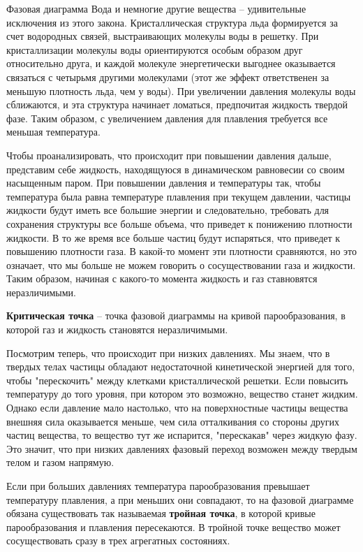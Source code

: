 \documentclass{article}
\newcommand{\definition}[2]{\begin{samepage} \textbf{#1} -- #2. \end{samepage} \par}
\begin{document}
\begin{section}{Фазовая диаграмма}
		Вода и немногие другие вещества -- удивительные исключения из этого закона. Кристаллическая структура льда формируется за счет водородных связей, выстраивающих молекулы воды в решетку. При кристаллизации молекулы воды ориентируются особым образом друг относительно друга, и каждой молекуле энергетически выгоднее оказывается связаться с четырьмя другими молекулами (этот же эффект ответственен за меньшую плотность льда, чем у воды). При увеличении давления молекулы воды сближаются, и эта структура начинает ломаться, предпочитая жидкость твердой фазе. Таким образом, с увеличением давления для плавления требуется все меньшая температура.

		Чтобы проанализировать, что происходит при повышении давления дальше, представим себе жидкость, находящуюся в динамическом равновесии со своим насыщенным паром. При повышении давления и температуры так, чтобы температура была равна температуре плавления при текущем давлении, частицы жидкости будут иметь все большие энергии и следовательно, требовать для сохранения структуры все больше объема, что приведет к понижению плотности жидкости. В то же время все больше частиц будут испаряться, что приведет к повышению плотности газа. В какой-то момент эти плотности сравняются, но это означает, что мы больше не можем говорить о сосуществовании газа и жидкости. Таким образом, начиная с какого-то момента жидкость и газ ставновятся неразличимыми.

		\definition{Критическая точка}{точка фазовой диаграммы на кривой парообразования, в которой газ и жидкость становятся неразличимыми}

		Посмотрим теперь, что происходит при низких давлениях. Мы знаем, что в твердых телах частицы обладают недостаточной кинетической энергией для того, чтобы "перескочить" между клетками кристаллической решетки. Если повысить температуру до того уровня, при котором это возможно, вещество станет жидким. Однако если давление мало настолько, что на поверхностные частицы вещества внешняя сила оказывается меньше, чем сила отталкивания со стороны других частиц вещества, то вещество тут же испарится, "перескакав" через жидкую фазу. Это значит, что при низких давлениях фазовый переход возможен между твердым телом и газом напрямую.

		Если при больших давлениях температура парообразования превышает температуру плавления, а при меньших они совпадают, то на фазовой диаграмме обязана существовать так называемая \textbf{тройная точка}, в которой кривые парообразования и плавления пересекаются. В тройной точке вещество может сосуществовать сразу в трех агрегатных состояниях.


\end{section}
\end{document}
